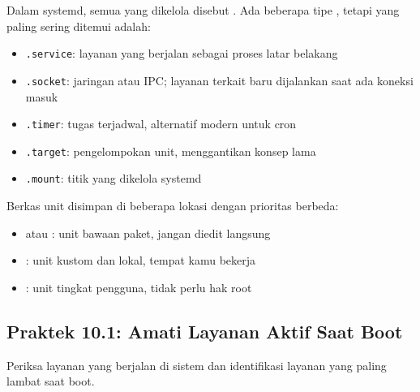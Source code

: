 Dalam systemd, semua yang dikelola disebut . Ada beberapa tipe , tetapi yang paling sering ditemui adalah:

\begin{itemize}
    \item \texttt{.service}: layanan yang berjalan sebagai proses latar belakang
    \item \texttt{.socket}:  jaringan atau IPC; layanan terkait baru dijalankan saat ada koneksi masuk
    \item \texttt{.timer}: tugas terjadwal, alternatif modern untuk cron
    \item \texttt{.target}: pengelompokan unit, menggantikan konsep  lama
    \item \texttt{.mount}: titik   yang dikelola systemd
\end{itemize}

Berkas unit disimpan di beberapa lokasi dengan prioritas berbeda:

\begin{itemize}
    \item {} atau : unit bawaan paket, jangan diedit langsung
    \item {}: unit kustom dan  lokal, tempat kamu bekerja
    \item {}: unit tingkat pengguna, tidak perlu hak root
\end{itemize}

\subsection*{Praktek 10.1: Amati Layanan Aktif Saat Boot}

Periksa layanan yang berjalan di sistem dan identifikasi layanan yang paling lambat saat boot.

